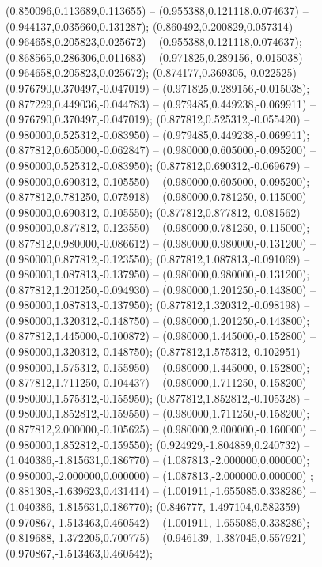  (0.850096,0.113689,0.113655) -- (0.955388,0.121118,0.074637) -- (0.944137,0.035660,0.131287);
 (0.860492,0.200829,0.057314) -- (0.964658,0.205823,0.025672) -- (0.955388,0.121118,0.074637);
 (0.868565,0.286306,0.011683) -- (0.971825,0.289156,-0.015038) -- (0.964658,0.205823,0.025672);
 (0.874177,0.369305,-0.022525) -- (0.976790,0.370497,-0.047019) -- (0.971825,0.289156,-0.015038);
 (0.877229,0.449036,-0.044783) -- (0.979485,0.449238,-0.069911) -- (0.976790,0.370497,-0.047019);
 (0.877812,0.525312,-0.055420) -- (0.980000,0.525312,-0.083950) -- (0.979485,0.449238,-0.069911);
 (0.877812,0.605000,-0.062847) -- (0.980000,0.605000,-0.095200) -- (0.980000,0.525312,-0.083950);
 (0.877812,0.690312,-0.069679) -- (0.980000,0.690312,-0.105550) -- (0.980000,0.605000,-0.095200);
 (0.877812,0.781250,-0.075918) -- (0.980000,0.781250,-0.115000) -- (0.980000,0.690312,-0.105550);
 (0.877812,0.877812,-0.081562) -- (0.980000,0.877812,-0.123550) -- (0.980000,0.781250,-0.115000);
 (0.877812,0.980000,-0.086612) -- (0.980000,0.980000,-0.131200) -- (0.980000,0.877812,-0.123550);
 (0.877812,1.087813,-0.091069) -- (0.980000,1.087813,-0.137950) -- (0.980000,0.980000,-0.131200);
 (0.877812,1.201250,-0.094930) -- (0.980000,1.201250,-0.143800) -- (0.980000,1.087813,-0.137950);
 (0.877812,1.320312,-0.098198) -- (0.980000,1.320312,-0.148750) -- (0.980000,1.201250,-0.143800);
 (0.877812,1.445000,-0.100872) -- (0.980000,1.445000,-0.152800) -- (0.980000,1.320312,-0.148750);
 (0.877812,1.575312,-0.102951) -- (0.980000,1.575312,-0.155950) -- (0.980000,1.445000,-0.152800);
 (0.877812,1.711250,-0.104437) -- (0.980000,1.711250,-0.158200) -- (0.980000,1.575312,-0.155950);
 (0.877812,1.852812,-0.105328) -- (0.980000,1.852812,-0.159550) -- (0.980000,1.711250,-0.158200);
 (0.877812,2.000000,-0.105625) -- (0.980000,2.000000,-0.160000) -- (0.980000,1.852812,-0.159550);
 (0.924929,-1.804889,0.240732) -- (1.040386,-1.815631,0.186770) -- (1.087813,-2.000000,0.000000);
 (0.980000,-2.000000,0.000000) -- (1.087813,-2.000000,0.000000) ;
 (0.881308,-1.639623,0.431414) -- (1.001911,-1.655085,0.338286) -- (1.040386,-1.815631,0.186770);
 (0.846777,-1.497104,0.582359) -- (0.970867,-1.513463,0.460542) -- (1.001911,-1.655085,0.338286);
 (0.819688,-1.372205,0.700775) -- (0.946139,-1.387045,0.557921) -- (0.970867,-1.513463,0.460542);
